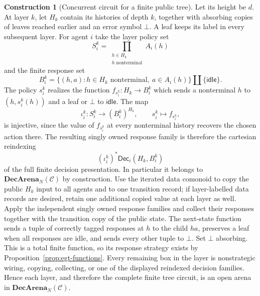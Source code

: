 \documentclass[11pt,a4paper]{article}
\numberwithin{equation}{section}
\theoremstyle{definition}
\newtheorem{construction}[construction]{Construction}
\theoremstyle{remark}
\theoremstyle{plain}
\begin{document}
\begin{construction}[Concurrent circuit for a finite public tree]

\label{con:egt-public-tree-circuit}
Let its height be $d$. At layer $k$, let $H_k$ contain its histories
of depth $k$, together with absorbing copies of leaves reached
earlier and an error symbol $\bot$. A leaf keeps its label in every
subsequent layer. For agent $i$ take the layer policy set
\[
 S_i^k=\prod_{\substack{h\in H_k\\h\text{ nonterminal}}}A_i(h)
\]
and the finite response set
\[
 B_i^k=\{(h,a):h\in H_k\text{ nonterminal},\ a\in A_i(h)\}
       \amalg\{\mathsf{idle}\}.
\]
The policy $s_i^k$ realizes the function $f_{s_i^k}:H_k\to B_i^k$
which sends a nonterminal $h$ to $(h,s_i^k(h))$ and a leaf or
$\bot$ to $\mathsf{idle}$. The map
\[
 \iota_i^k:S_i^k\longrightarrow(B_i^k)^{H_k},
 \qquad
 s_i^k\longmapsto f_{s_i^k},
\]
is injective, since the value of $f_{s_i^k}$ at every nonterminal history
recovers the chosen action there. The resulting singly owned response family
is therefore the cartesian reindexing
\[
 (\iota_i^k)^*\mathsf{Dec}_i(H_k,B_i^k)
\]
of the full finite decision presentation. In particular it belongs to
$\mathbf{DecArena}_N(\mathcal C)$ by construction. Use the iterated data
comonoid to copy the
public $H_k$ input to all agents and to one transition record; if
layer-labelled data records are desired, retain one additional copied
value at each layer as well. Apply the independent singly owned response families and collect
their responses together with the transition copy of the public state.
The next-state function sends a tuple of correctly tagged responses at
$h$ to the child $ha$, preserves a leaf when all responses are idle, and
sends every other tuple to $\bot$. Set $\bot$ absorbing. This is a
total finite function, so its response strategy exists by
Proposition~\ref{prop:egt-functions}. Every remaining box in the layer is
nonstrategic wiring, copying, collecting, or one of the displayed reindexed
decision families. Hence each layer, and therefore the complete finite tree
circuit, is an open arena in $\mathbf{DecArena}_N(\mathcal C)$.


\end{construction}
\end{document}
